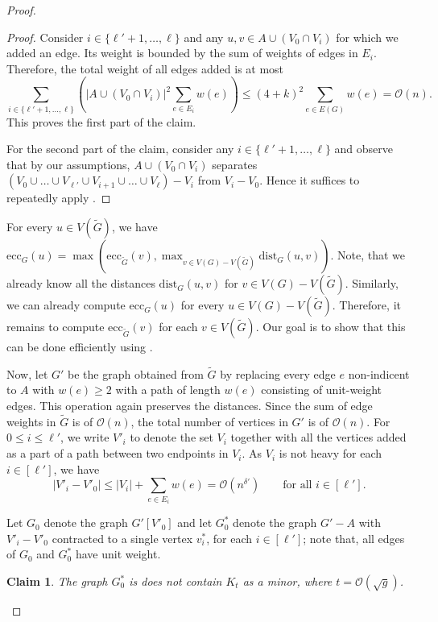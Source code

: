 \documentclass[11pt,a4paper]{article}
\newtheorem{claim}{Claim}[section]
\newcommand{\Oh}{\mathcal{O}}
\newcommand{\dist}{\mathrm{dist}}
\newcommand{\ecc}{\mathrm{ecc}}
\renewcommand{\leq}{\leqslant}
\renewcommand{\geq}{\geqslant}
\renewcommand{\setminus}{-}
\begin{document}
\begin{proof}
\begin{proof}
Consider $i \in \{\ell' + 1, \dots, \ell\}$ and any $u, v \in A \cup (V_0 \cap V_i)$ for which we added an edge. Its weight is bounded by the sum of weights of edges in $E_i$. Therefore, the total weight of all edges added is at most
$$
\sum_{i \in \{\ell' + 1, \dots, \ell\}} \left( |A \cup (V_0 \cap V_i)|^2 \sum_{e \in E_i} w(e) \right) \leq (4 + k)^2 \sum_{e \in E(G)} w(e) = \Oh(n).
$$
This proves the first part of the claim.

For the second part of the claim, consider any $i \in \{\ell' + 1, \dots, \ell \}$ and observe that by our assumptions, $A \cup (V_0 \cap V_i)$ separates $(V_0 \cup \dots \cup V_{\ell'} \cup V_{i + 1} \cup \dots \cup V_\ell) \setminus V_i$ from $V_i \setminus V_0$. Hence it suffices to repeatedly apply .
\end{proof}

For every $u \in V(\widetilde{G})$, we have $\ecc_G(u) = \max(\ecc_{\widetilde{G}}(v), \max_{v \in V(G) \setminus V(\widetilde{G})} \dist_G(u, v))$. Note, that we already know all the distances $\dist_G(u, v)$ for $v \in V(G) \setminus V(\widetilde{G})$. Similarly, we can already compute $\ecc_G(u)$ for every $u \in V(G) \setminus V(\widetilde{G})$. Therefore, it remains to compute $\ecc_{\widetilde{G}}(v)$ for each $v \in V(\widetilde{G})$. Our goal is to show that this can be done efficiently using .

Now, let $G'$ be the graph obtained from $\tilde{G}$ by replacing every edge $e$ non-indicent to $A$ with $w(e)\geq 2$ with a path of length $w(e)$ consisting of unit-weight edges. This operation again preserves the distances. Since the sum of edge weights in $\tilde{G}$ is of $\Oh(n)$, the total number of vertices in $G'$ is of $\Oh(n)$. For $0 \leq i \leq \ell'$, we write $V'_i$ to denote the set $V_i$ together with all the vertices added as a part of a path between two endpoints in $V_i$.
As $V_i$ is not heavy for each $i\in [\ell']$, we have
$$
|V'_i \setminus V'_0| \leq |V_i| + \sum_{e \in E_i} w(e) = \Oh(n^{\delta'})\qquad \textrm{for all }i\in [\ell'].
$$

Let $G_0$ denote the graph $G'[V'_0]$ and let $G_0^*$ denote the graph $G'- A$ with $V'_i - V'_0$ contracted to a single vertex $v_i^*$, for each $i \in [\ell']$; note that, all edges of $G_0$ and $G_0^*$ have unit weight.

\begin{claim}
	The graph $G_0^*$ is does not contain $K_{t}$ as a minor, where $t = \Oh(\sqrt{g})$.
\end{claim}


\end{proof}
\end{document}
